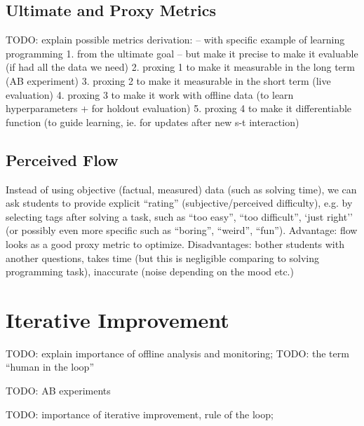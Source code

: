 



\subsection{Ultimate and Proxy Metrics}

TODO: explain possible metrics derivation: -- with specific example of learning programming
1. from the ultimate goal -- but make it precise to make it evaluable (if had all the data we need)
2. proxing 1 to make it measurable in the long term (AB experiment)
3. proxing 2 to make it measurable in the short term (live evaluation)
4. proxing 3 to make it work with offline data (to learn hyperparameters + for holdout evaluation)
5. proxing 4 to make it differentiable function (to guide learning, ie. for updates after new s-t interaction)



\subsection{Perceived Flow}

Instead of using objective (factual, measured) data (such as solving time),
we can ask students to provide explicit ``rating'' (subjective/perceived difficulty),
  e.g. by selecting tags after solving a task,
  such as ``too easy'', ``too difficult'', `just right''
  (or possibly even more specific such as ``boring'', ``weird'', ``fun'').
Advantage: flow looks as a good proxy metric to optimize.
Disadvantages:
  bother students with another questions,
  takes time (but this is negligible comparing to solving programming task),
  inaccurate (noise depending on the mood etc.)



\section{Iterative Improvement}
\label{sec:iterative-improvement}

TODO: explain importance of offline analysis and monitoring;
TODO: the term ``human in the loop'' \cite{stupid-tutoring-systems-intelligent-humans}

TODO: AB experiments

TODO: importance of iterative improvement, rule of the loop;
